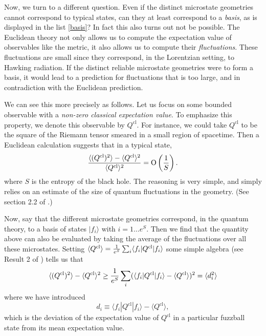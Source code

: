 \documentclass[12pt]{article}
\def\qop{Q}
\def\Or[#1]{{\text{O}}\left({#1}\right)}
\newcommand{\be}{\begin{equation}}
\newcommand{\ee}{\end{equation}}
\begin{document}
Now, we turn to a different question. Even if the distinct microstate geometries cannot correspond to typical states, can they at least correspond to a {\em basis}, as is displayed in the list \eqref{basis}?  In fact this also turns out not be possible. The Euclidean theory not only allows us to compute the expectation value of observables like the metric, it also allows us to compute their {\em fluctuations}. These fluctuations are small since they correspond, in the Lorentzian setting, to Hawking radiation.  If the distinct reliable microstate geometries were to form a basis, it would lead to a prediction for fluctuations that is too large, and in contradiction with the Euclidean prediction.

We can see this more precisely as follows. Let us focus on some bounded observable with a {\em non-zero classical expectation value}. To emphasize this property, we denote this observable by $\qop^{\text{cl}}$. For instance, we could take $\qop^{\text{cl}}$ to be the square of the Riemann tensor smeared in a small region of spacetime.  Then a Euclidean calculation suggests that in a typical state,
\be
{\langle (\qop^\text{cl})^2 \rangle - \langle \qop^{\text{cl}} \rangle^2 \over \langle \qop^{\text{cl}} \rangle^2} =\Or[{1 \over S}].
\ee
where $S$ is the entropy of the black hole. The reasoning is very simple, and simply relies on an estimate of the size of quantum fluctuations in the geometry. (See section 2.2 of \cite{Raju:2018xue}.)

Now, say that the different microstate geometries correspond, in the quantum theory, to a basis of states $|f_i \rangle$ with $i = 1 \ldots e^{S}$. Then we find that the quantity above can also be evaluated by taking the average of the fluctuations over all these microstates. Setting $\langle \qop^{\text{cl}} \rangle = {1 \over e^{S}} \sum_i \langle f_i | \qop^{\text{cl}} | f_i \rangle$ some simple algebra (see Result 2 of \cite{Raju:2018xue}) tells us that
\be
\langle (\qop^{\text{cl}})^2 \rangle - \langle \qop^{\text{cl}} \rangle^2  \geq {1 \over e^{S}} \sum_i (\langle f_i | \qop^{\text{cl}} | f_i \rangle - \langle \qop^{\text{cl}} \rangle)^2 = \langle d_i^2 \rangle
\ee
where we have introduced
\be
d_i \equiv \langle f_i | \qop^{\text{cl}} | f_i \rangle - \langle \qop^{\text{cl}}  \rangle,
\ee
which is the deviation of the expectation value of $\qop^{\text{cl}}$ in a particular fuzzball state from its mean expectation value.
\end{document}
